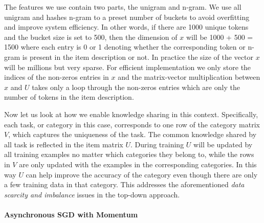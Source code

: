 The features we use contain two parts, the unigram and n-gram. We use all unigram and hashes n-gram to a preset number of buckets to avoid overfitting and improve system efficiency. In other words, if there are 1000 unique tokens and the bucket size is set to 500, then the dimension of $x$ will be 1000 + 500 = 1500 where each entry is 0 or 1 denoting whether the corresponding token or n-gram is present in the item description or not. In practice the size of the vector $x$ will be millions but very sparse. For efficient implementation we only store the indices of the non-zeros entries in $x$ and the matrix-vector multiplication between $x$ and $U$ takes only a loop through the non-zeros entries which are only the number of tokens in the item description. 

Now let us look at how we enable knowledge sharing in this context. Specifically, each task, or category in this case, corresponds to one row of the category matrix $V$, which captures the uniqueness of the task. The common knowledge shared by all task is reflected in the item matrix $U$. During training $U$ will be updated by all training examples no matter which categories they belong to, while the rows in $V$ are only updated with the examples in the corresponding categories. In this way $U$ can help improve the accuracy of the category even though there are only a few training data in that category. This addresses the aforementioned \emph{data scarcity and imbalance} issues in the top-down approach.

\paragraph{Asynchronous SGD with Momentum}
























